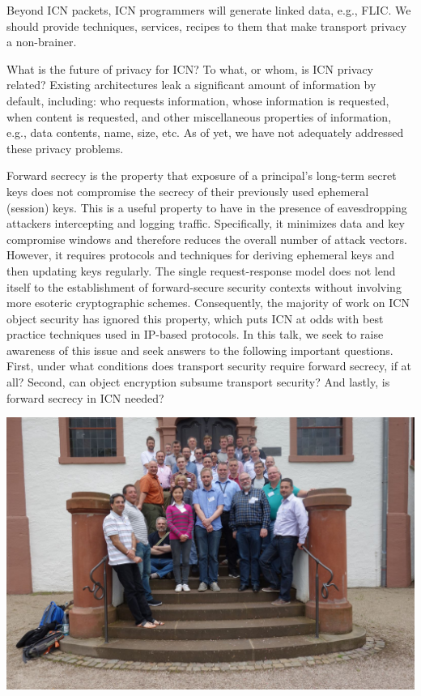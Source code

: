 \documentclass[a4paper,UKenglish]{dagrep}
\begin{document}
\license

Beyond ICN packets, ICN programmers will generate linked data, e.g., FLIC. We should provide techniques, services, recipes to them that make transport privacy a non-brainer.

\license

What is the future of privacy for ICN? To what, or whom, is ICN privacy related? Existing architectures leak a significant amount of information by default, including: who requests information, whose information is requested, when content is requested, and other miscellaneous properties of information, e.g., data contents, name, size, etc. As of yet, we have not adequately addressed these privacy problems.

\license

Forward secrecy is the property that exposure of a principal's long-term secret keys does not compromise the secrecy of their previously used ephemeral (session) keys. This is a useful property to have in the presence of eavesdropping attackers intercepting and logging traffic. Specifically, it minimizes data and key compromise windows and therefore reduces the overall number of attack vectors. However, it requires protocols and techniques for deriving ephemeral keys and then updating keys regularly. The single request-response model does not lend itself to the establishment of forward-secure security contexts without involving more esoteric cryptographic schemes. Consequently, the majority of work on ICN object security has ignored this property, which puts ICN at odds with best practice techniques used in IP-based protocols. In this talk, we seek to raise awareness of this issue and seek answers to the following important questions. First, under what conditions does transport security require forward secrecy, if at all? Second, can object encryption subsume transport security? And lastly, is forward secrecy in ICN needed?


\vfill

\begin{center}
\includegraphics[width=1.0\textwidth]{16251.jpg}
\end{center}
\end{document}
